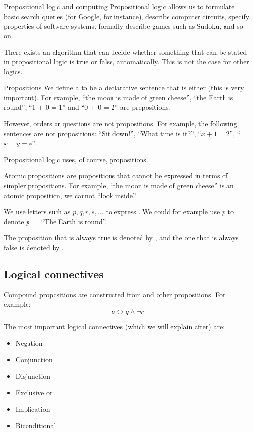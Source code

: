 \documentclass{article}
\begin{document}
\begin{parag}{Propositional logic and computing}
    Propositional logic allows us to formulate basic search queries (for Google, for instance), describe computer circuits, specify properties of software systems, formally describe games such as Sudoku, and so on.

    There exists an algorithm that can decide whether something that can be stated in propositional logic is true or false, automatically. This is not the case for other logics.
\end{parag}

\begin{parag}{Propositions}
    We define a  to be a declarative sentence that is either  (this is very important). For example, ``the moon is made of green cheese'', ``the Earth is round'', ``1 + 0 = 1'' and ``0 + 0 = 2'' are propositions.

    However, orders or questions are not propositions. For example, the following sentences are not propositions: ``Sit down!'', ``What time is it?'', ``$x + 1 = 2$'', ``$x + y = z$''.

    Propositional logic uses, of course, propositions.
\end{parag}

\begin{parag}{Atomic propositions}
     are propositions that cannot be expressed in terms of simpler propositions. For example, ``the moon is made of green cheese'' is an atomic proposition, we cannot ``look inside''.

    We use letters such as $p, q, r, s, \ldots$ to express . We could for example use $p$ to denote $p = $ ``The Earth is round''. 

    The proposition that is always true is denoted by , and the one that is always false is denoted by .
\end{parag}


\subsection{Logical connectives}
\begin{parag}{Compound propositions}
     are constructed from  and other propositions. For example: 
    \[p \leftrightarrow q \land \lnot r\]

    The most important logical connectives (which we will explain after) are: 
    \begin{itemize}
        \item Negation
        \item Conjunction
        \item Disjunction
        \item Exclusive or
        \item Implication
        \item Biconditional
    \end{itemize}
    
\end{parag}
\end{document}

